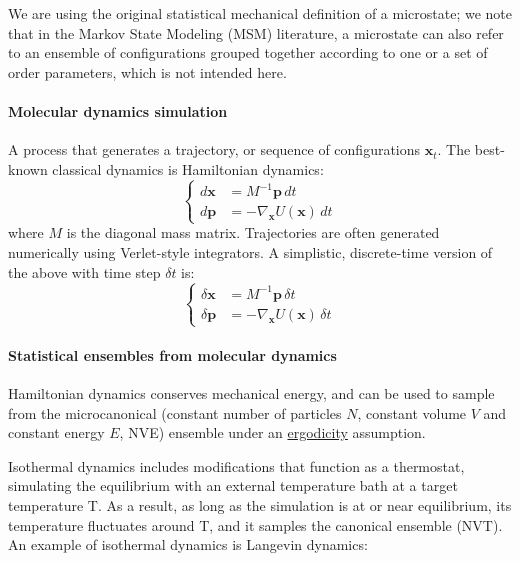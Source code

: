 \documentclass[9pt,review]{livecoms}
\newcommand{\vx}{\mathbf{x}}
\newcommand{\vp}{\mathbf{p}}
\begin{document}
We are using the original statistical mechanical definition of a microstate; we note that in the Markov State Modeling (MSM) literature, a microstate can also refer to an ensemble of configurations grouped together according to one or a set of order parameters, which is not intended here.

\paragraph{Molecular dynamics simulation}
A process that generates a trajectory, or sequence of configurations $\vx_t$.
The best-known classical dynamics is Hamiltonian dynamics:
\begin{equation}
\left\{
\begin{array}{ll}
    d\vx &= M^{-1} \vp \,  dt \\
    d\vp &= -\nabla_\vx U(\vx) \, dt
\end{array}
\right.
    \label{eq:md}
\end{equation}
where $M$ is the diagonal mass matrix.
Trajectories are often generated numerically using Verlet-style integrators.
A simplistic, discrete-time version of the above with time step $\delta t$ is:
\begin{equation}
\left\{
\begin{array}{ll}
    \delta \vx &= M^{-1} \vp \, \delta t \\
    \delta \vp &= -\nabla_\vx U(\vx) \, \delta t
    \label{eq:md_discrete}
\end{array}
\right.
\end{equation}

\hypertarget{ref:Ensemble} {\paragraph{Statistical ensembles from molecular dynamics}}
Hamiltonian dynamics conserves mechanical energy, and can be used to sample from the microcanonical (constant number of particles $N$, constant volume $V$ and constant energy $E$, NVE) ensemble under an \hyperlink{ref:ergodic} {ergodicity} assumption.

Isothermal dynamics includes modifications that function as a thermostat, simulating the equilibrium with an external temperature bath at a target temperature T.
As a result, as long as the simulation is at or near equilibrium, its temperature fluctuates around T, and it samples the canonical ensemble (NVT).
An example of isothermal dynamics is \hypertarget{ref:Langevin} {Langevin dynamics}:
\end{document}
